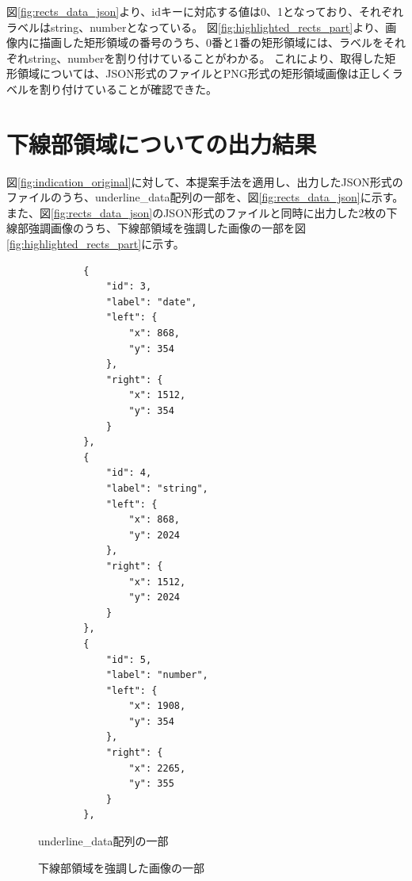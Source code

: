 図\ref{fig:rects_data_json}より、idキーに対応する値は0、1となっており、それぞれラベルはstring、numberとなっている。
図\ref{fig:highlighted_rects_part}より、画像内に描画した矩形領域の番号のうち、0番と1番の矩形領域には、ラベルをそれぞれstring、numberを割り付けていることがわかる。
これにより、取得した矩形領域については、JSON形式のファイルとPNG形式の矩形領域画像は正しくラベルを割り付けていることが確認できた。


\section{下線部領域についての出力結果}\label{sec:result_underline}
図\ref{fig:indication_original}に対して、本提案手法を適用し、出力したJSON形式のファイルのうち、underline\_data配列の一部を、図\ref{fig:rects_data_json}に示す。
また、図\ref{fig:rects_data_json}のJSON形式のファイルと同時に出力した2枚の下線部強調画像のうち、下線部領域を強調した画像の一部を図\ref{fig:highlighted_rects_part}に示す。

\lstset{language=}
\begin{figure}[t]
    \begin{lstlisting}
        {
            "id": 3,
            "label": "date",
            "left": {
                "x": 868,
                "y": 354
            },
            "right": {
                "x": 1512,
                "y": 354
            }
        },
        {
            "id": 4,
            "label": "string",
            "left": {
                "x": 868,
                "y": 2024
            },
            "right": {
                "x": 1512,
                "y": 2024
            }
        },
        {
            "id": 5,
            "label": "number",
            "left": {
                "x": 1908,
                "y": 354
            },
            "right": {
                "x": 2265,
                "y": 355
            }
        },
    \end{lstlisting}
    \caption{underline\_data配列の一部}\label{fig:underlines_data_json}
\end{figure}

\begin{figure}[t]
    \begin{center}
        \caption{下線部領域を強調した画像の一部}
        \label{fig:highlighted_underlines_part}
    \end{center}
\end{figure}

